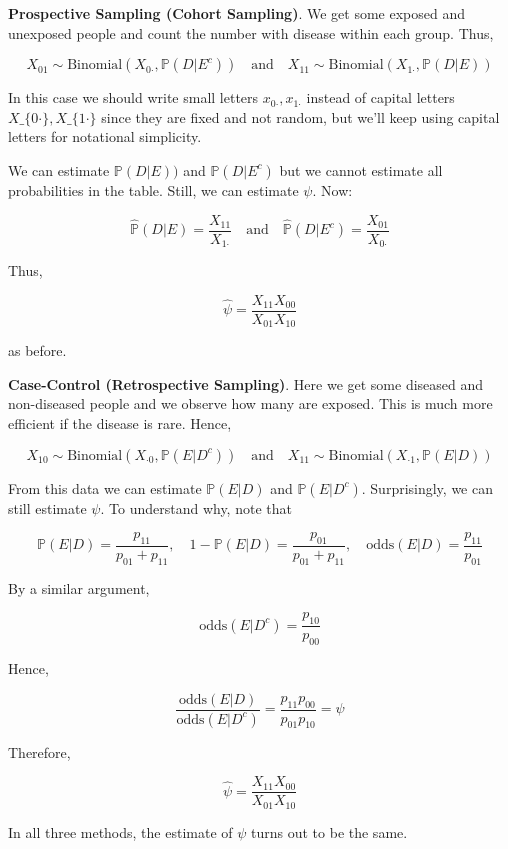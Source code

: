 \textbf{Prospective Sampling (Cohort Sampling)}. We get some exposed and
unexposed people and count the number with disease within each group.
Thus,

\[
X_{01} \sim \text{Binomial}(X_{0\text{·}}, \mathbb{P}(D | E^{c}))
\quad \text{and} \quad
X_{11} \sim \text{Binomial}(X_{1\text{·}}, \mathbb{P}(D | E))
\]

In this case we should write small letters
\(x_{0\text{·}},  x_{1\text{·}}\) instead of capital letters $
X\_\{0\text{·}\}, X\_\{1\text{·}\}$ since they are fixed and not
random, but we'll keep using capital letters for notational simplicity.

We can estimate \(\mathbb{P}(D | E))\) and \(\mathbb{P}(D | E^{c})\) but
we cannot estimate all probabilities in the table. Still, we can
estimate \(\psi\). Now:

\[\hat{\mathbb{P}}(D | E) = \frac{X_{11}}{X_{1\text{·}}}
\quad \text{and} \quad
\hat{\mathbb{P}}(D | E^{c}) = \frac{X_{01}}{X_{0\text{·}}}
\]

Thus,

\[ \hat{\psi} = \frac{X_{11} X_{00}}{X_{01} X_{10}}\]

as before.

\textbf{Case-Control (Retrospective Sampling)}. Here we get some
diseased and non-diseased people and we observe how many are exposed.
This is much more efficient if the disease is rare. Hence,

\[
X_{10} \sim \text{Binomial}(X_{\text{·}0}, \mathbb{P}(E | D^{c}))
\quad \text{and} \quad
X_{11} \sim \text{Binomial}(X_{\text{·}1}, \mathbb{P}(E | D))
\]

From this data we can estimate \(\mathbb{P}(E | D)\) and
\(\mathbb{P}(E | D^{c})\). Surprisingly, we can still estimate \(\psi\).
To understand why, note that

\[
\mathbb{P}(E | D) = \frac{p_{11}}{p_{01} + p_{11}},
\quad 1 - \mathbb{P}(E | D) = \frac{p_{01}}{p_{01} + p_{11}},
\quad \text{odds}(E | D) = \frac{p_{11}}{p_{01}}
\]

By a similar argument,

\[\text{odds}(E | D^{c}) = \frac{p_{10}}{p_{00}}\]

Hence,

\[\frac{\text{odds}(E | D)}{\text{odds}(E | D^{c})} = \frac{p_{11} p_{00}}{p_{01} p_{10}} = \psi\]

Therefore,

\[\hat{\psi} = \frac{X_{11} X_{00}}{X_{01} X_{10}}\]

In all three methods, the estimate of \(\psi\) turns out to be the same.

